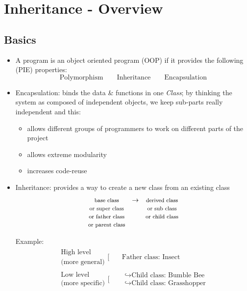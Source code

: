 
\chapter{Inheritance - Overview}
\thispagestyle{empty}

\section{Basics} %
\label{sec:basics}

\begin{itemize}
\item A program is an object oriented program (OOP) if it provides the following (PIE) properties:
\begin{equation*}
\boxed{\text{Polymorphism}} \qquad \boxed{\text{Inheritance}} \qquad  \boxed{\text{Encapsulation}}
\end{equation*} 

\item Encapsulation: binds the data \& functions in one \textit{Class}; by thinking the system as composed of independent objects, we keep sub-parts really independent and this:
\begin{itemize}[$\rightarrow$]
    \item allows different groups of programmers to work on different parts of the project
    \item allows extreme modularity
    \item increases code-reuse
\end{itemize}

\item Inheritance: provides a way to create a new class from an existing class
\begin{equation*}
\begin{array}{ccc}
\text{\footnotesize base class} & \to & \text{\footnotesize derived class} \\
\text{\footnotesize or super class} &  & \text{\footnotesize or sub class} \\
\text{\footnotesize or father class} &  & \text{\footnotesize or child class} \\
\text{\footnotesize or parent class} &  & 
\end{array}
\end{equation*}

Example:
\begin{align*}
\begin{array}{c}
\text{High level} \\
\text{(more general)}  
\end{array}
\bigg[
&\quad\text{Father class: Insect}
 \\
\begin{array}{c}
\text{Low level} \\
\text{(more specific)}  
\end{array}
\bigg[
&\quad\begin{array}{l}
\hookrightarrow \text{Child class: Bumble Bee} \\
\hookrightarrow \text{Child class: Grasshopper}
\end{array}
\end{align*}


\end{itemize}
